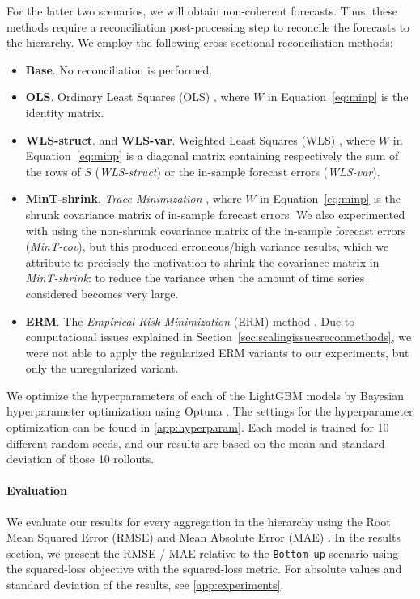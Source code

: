 \documentclass[preprint, 3p, times, twocolumn]{elsarticle}
\begin{document}
  For the latter two scenarios, we will obtain non-coherent forecasts. Thus, these methods require a reconciliation post-processing step to reconcile the forecasts to the hierarchy. We employ the following cross-sectional reconciliation methods:
  \begin{itemize}
    \item \textbf{Base}. No reconciliation is performed.
    \item \textbf{OLS}. Ordinary Least Squares (OLS) \cite{hyndman_optimal_2011}, where \(W\) in Equation~\eqref{eq:minp} is the identity matrix.
    \item \textbf{WLS-struct}. and \textbf{WLS-var}. Weighted Least Squares (WLS) \cite{wickramasuriya_optimal_2019}, where \(W\) in Equation~\eqref{eq:minp} is a diagonal matrix containing respectively the sum of the rows of \(S\) (\textit{WLS-struct}) or the in-sample forecast errors (\textit{WLS-var}).
    \item \textbf{MinT-shrink}. \textit{Trace Minimization} \cite{wickramasuriya_optimal_2019}, where \(W\) in Equation~\eqref{eq:minp} is the shrunk covariance matrix of in-sample forecast errors. We also experimented with using the non-shrunk covariance matrix of the in-sample forecast errors (\textit{MinT-cov}), but this produced erroneous/high variance results, which we attribute to precisely the motivation to shrink the covariance matrix in \textit{MinT-shrink}: to reduce the variance when the amount of time series considered becomes very large.
    \item \textbf{ERM}. The \textit{Empirical Risk Minimization} (ERM) method \cite{bentaieb_regularized_2019}. Due to computational issues explained in Section~\ref{sec:scalingissuesreconmethods}, we were not able to apply the regularized ERM variants to our experiments, but only the unregularized variant.
  \end{itemize}
  
  We optimize the hyperparameters of each of the LightGBM models by Bayesian hyperparameter optimization using Optuna \cite{akiba_optuna_2019}. The settings for the hyperparameter optimization can be found in \ref{app:hyperparam}. Each model is trained for 10 different random seeds, and our results are based on the mean and standard deviation of those 10 rollouts.

  \paragraph{Evaluation} We evaluate our results for every aggregation in the hierarchy using the Root Mean Squared Error (RMSE) and Mean Absolute Error (MAE) \cite{hyndman_forecasting_2021}. In the results section, we present the RMSE / MAE relative to the \texttt{Bottom-up} scenario using the squared-loss objective with the squared-loss metric. For absolute values and standard deviation of the results, see \ref{app:experiments}.
\end{document}
